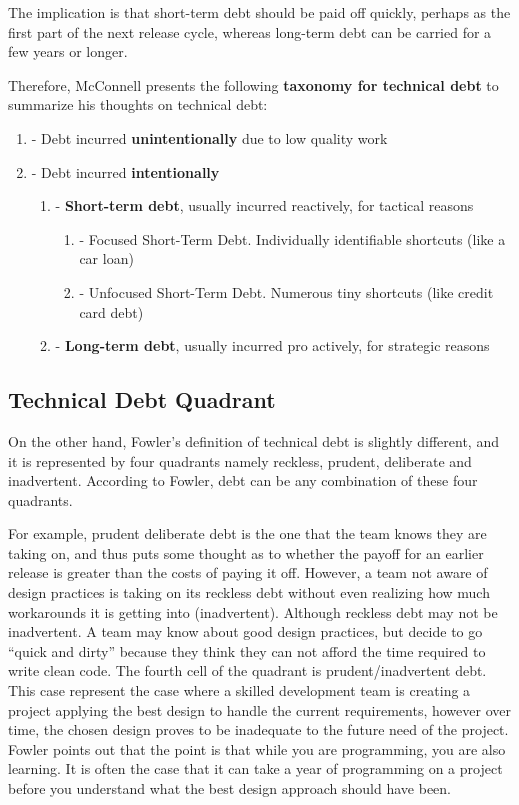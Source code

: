 The implication is that short-term debt should be paid off quickly, perhaps as the first part of the next release cycle, whereas long-term debt can be carried for a few years or longer.

Therefore, McConnell presents the following \textbf{taxonomy for technical debt} to summarize his thoughts on technical debt:

\begin{enumerate}
    \item - Debt incurred \textbf{unintentionally} due to low quality work
    \item - Debt incurred \textbf{intentionally}
    \begin{enumerate}
        \item - \textbf{Short-term debt}, usually incurred reactively, for tactical reasons
        \begin{enumerate}
            \item - Focused Short-Term Debt. Individually identifiable shortcuts (like a car loan)
            \item - Unfocused Short-Term Debt. Numerous tiny shortcuts (like credit card debt)
        \end{enumerate}
        \item - \textbf{Long-term debt}, usually incurred pro actively, for strategic reasons
    \end{enumerate}
\end{enumerate}

\subsection{Technical Debt Quadrant}
\label{chap2:fowler_subsection}

On the other hand, Fowler's definition of technical debt is slightly different, and it is represented by four quadrants namely reckless, prudent, deliberate and inadvertent. According to Fowler, debt can be any combination of these four quadrants. 

For example, prudent deliberate debt is the one that the team knows they are taking on, and thus puts some thought as to whether the payoff for an earlier release is greater than the costs of paying it off. However, a team not aware of design practices is taking on its reckless debt without even realizing how much workarounds it is getting into (inadvertent). Although reckless debt may not be inadvertent. A team may know about good design practices, but decide to go ``quick and dirty'' because they think they can not afford the time required to write clean code. The fourth cell of the quadrant is prudent/inadvertent debt. This case represent the case where a skilled development team is creating a project applying the best design to handle the current requirements, however over time, the chosen design proves to be inadequate to the future need of the project. Fowler points out that the point is that while you are programming, you are also learning. It is often the case that it can take a year of programming on a project before you understand what the best design approach should have been.  

